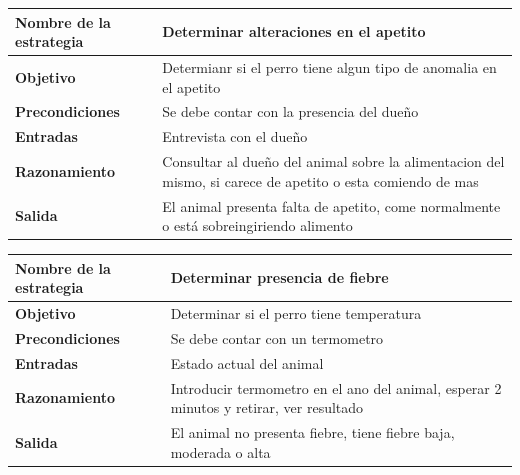 \documentclass[a4paper,table,xcdraw]{article}
\begin{document}
\begin{longtable}{|m{100pt}|m{300pt}|}
\hline
\textbf{Nombre de la estrategia} & Determinar alteraciones en el apetito                                                                      \\ \hline
\endhead
%
\textbf{Objetivo}                & Determianr si el perro tiene algun tipo de anomalia en el apetito                                          \\ \hline
\textbf{Precondiciones}          & Se debe contar con la presencia del dueño                                                                  \\ \hline
\textbf{Entradas}                & Entrevista con el dueño                                                                                    \\ \hline
\textbf{Razonamiento}            & Consultar al dueño del animal sobre la alimentacion del mismo, si carece de apetito o esta comiendo de mas \\ \hline
\textbf{Salida}                  & El animal presenta falta de apetito, come normalmente o está sobreingiriendo alimento                      \\ \hline
\end{longtable}

\begin{longtable}{|m{100pt}|m{300pt}|}
\hline
\textbf{Nombre de la estrategia} & Determinar presencia de fiebre                                                         \\ \hline
\endhead
%
\textbf{Objetivo}                & Determinar si el perro tiene temperatura                                               \\ \hline
\textbf{Precondiciones}          & Se debe contar con un termometro                                                       \\ \hline
\textbf{Entradas}                & Estado actual del animal                                                               \\ \hline
\textbf{Razonamiento}            & Introducir termometro en el ano del animal, esperar 2 minutos y retirar, ver resultado \\ \hline
\textbf{Salida}                  & El animal no presenta fiebre, tiene fiebre baja, moderada o alta                       \\ \hline
\end{longtable}
\end{document}
